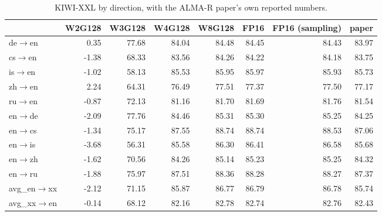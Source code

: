 \begin{table}[t]
\centering
\small
\begin{tabular}{lrrrrrrr}
\toprule
& W2G128 & W3G128 & W4G128 & W8G128 & FP16 & FP16 (sampling) & paper \\
\midrule
de$\rightarrow$en & 0.35 & 77.68 & 84.04 & 84.48 & 84.45 & 84.43 & 83.97 \\
cs$\rightarrow$en & -1.38 & 68.33 & 83.56 & 84.26 & 84.22 & 84.18 & 83.75 \\
is$\rightarrow$en & -1.02 & 58.13 & 85.53 & 85.95 & 85.97 & 85.93 & 85.73 \\
zh$\rightarrow$en & 2.24 & 64.31 & 76.49 & 77.51 & 77.37 & 77.50 & 77.17 \\
ru$\rightarrow$en & -0.87 & 72.13 & 81.16 & 81.70 & 81.69 & 81.76 & 81.54 \\
en$\rightarrow$de & -2.09 & 77.76 & 84.46 & 85.31 & 85.30 & 85.25 & 84.25 \\
en$\rightarrow$cs & -1.34 & 75.17 & 87.55 & 88.74 & 88.74 & 88.53 & 87.06 \\
en$\rightarrow$is & -3.68 & 56.31 & 85.58 & 86.30 & 86.41 & 86.58 & 85.68 \\
en$\rightarrow$zh & -1.62 & 70.56 & 84.26 & 85.14 & 85.23 & 85.25 & 84.32 \\
en$\rightarrow$ru & -1.88 & 75.97 & 87.51 & 88.36 & 88.28 & 88.27 & 87.37 \\
\midrule
avg\_en$\rightarrow$xx & -2.12 & 71.15 & 85.87 & 86.77 & 86.79 & 86.78 & 85.74 \\
avg\_xx$\rightarrow$en & -0.14 & 68.12 & 82.16 & 82.78 & 82.74 & 82.76 & 82.43 \\
\bottomrule
\end{tabular}
\caption{KIWI-XXL by direction, with the ALMA-R paper's own reported numbers.}
\label{tab:kiwi-xxl}
\end{table}

